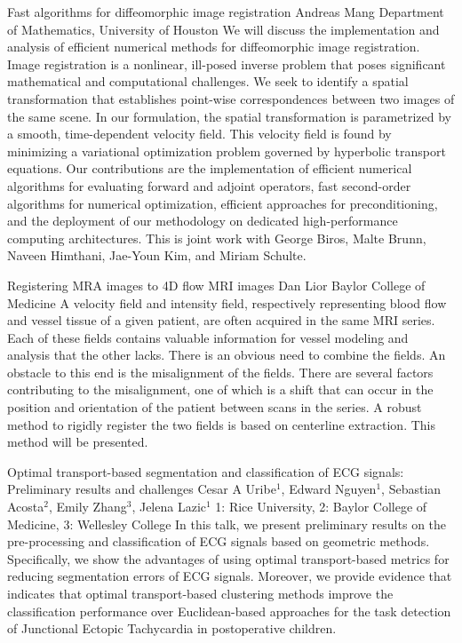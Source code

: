 \vspace{1.5ex}
\abs
{Fast algorithms for diffeomorphic image registration}
{Andreas Mang}
{Department of Mathematics, University of Houston}
{We will discuss the implementation and analysis of efficient numerical methods for diffeomorphic image registration. Image registration is a nonlinear, ill-posed inverse problem that poses significant mathematical and computational challenges. We seek to identify a spatial transformation that establishes point-wise correspondences between two images of the same scene. In our formulation, the spatial transformation is parametrized by a smooth, time-dependent velocity field. This velocity field is found by minimizing a variational optimization problem governed by hyperbolic transport equations. Our contributions are the implementation of efficient numerical algorithms for evaluating forward and adjoint operators, fast second-order algorithms for numerical optimization, efficient approaches for preconditioning, and the deployment of our methodology on dedicated high-performance computing architectures. This is joint work with George Biros, Malte Brunn, Naveen Himthani, Jae-Youn Kim, and Miriam Schulte.}


\vspace{1.5ex}
\abs
{Registering MRA images to 4D flow MRI images}
{Dan Lior}
{Baylor College of Medicine}
{A velocity field and intensity field, respectively representing blood flow and vessel tissue of a given patient, are often acquired in the same MRI series. Each of these fields contains valuable information for vessel modeling and analysis that the other lacks. There is an obvious need to combine the fields. An obstacle to this end is the misalignment of the fields. There are several factors contributing to the misalignment, one of which is a shift that can occur in the position and orientation of the patient between scans in the series. A robust method to rigidly register the two fields is based on centerline extraction. This method will be presented.}


\vspace{1.5ex}
\abs
{Optimal transport-based segmentation and classification of ECG signals: Preliminary results and challenges}
{Cesar A Uribe$^{1}$, Edward Nguyen$^{1}$, Sebastian Acosta$^{2}$, Emily Zhang$^{3}$, Jelena Lazic$^{1}$}
{1: Rice University, 2: Baylor College of Medicine, 3: Wellesley College }
{In this talk, we present preliminary results on the pre-processing and classification of ECG signals based on geometric methods. Specifically, we show the advantages of using optimal transport-based metrics for reducing segmentation errors of ECG signals. Moreover, we provide evidence that indicates that optimal transport-based clustering methods improve the classification performance over Euclidean-based approaches for the task detection of Junctional Ectopic Tachycardia in postoperative children.}


